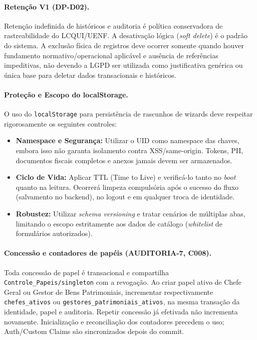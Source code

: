 \paragraph{Retenção V1 (DP-D02).}
Retenção indefinida de históricos e auditoria é política conservadora de rastreabilidade do LCQUI/UENF. A desativação lógica (\textit{soft delete}) é o padrão do sistema. A exclusão física de registros deve ocorrer somente quando houver fundamento normativo/operacional aplicável e ausência de referências impeditivas, não devendo a LGPD ser utilizada como justificativa genérica ou única base para deletar dados transacionais e históricos.

\paragraph{Proteção e Escopo do localStorage.}
O uso do \texttt{localStorage} para persistência de rascunhos de wizards deve respeitar rigorosamente os seguintes controles:
\begin{itemize}
    \item \textbf{Namespace e Segurança:} Utilizar o UID como namespace das chaves, embora isso não garanta isolamento contra XSS/same-origin. Tokens, PII, documentos fiscais completos e anexos jamais devem ser armazenados.
    \item \textbf{Ciclo de Vida:} Aplicar TTL (Time to Live) e verificá-lo tanto no \textit{boot} quanto na leitura. Ocorrerá limpeza compulsória após o sucesso do fluxo (salvamento no backend), no logout e em qualquer troca de identidade.
    \item \textbf{Robustez:} Utilizar \textit{schema versioning} e tratar cenários de múltiplas abas, limitando o escopo estritamente aos dados de catálogo (\textit{whitelist} de formulários autorizados).
\end{itemize}

\paragraph{Concessão e contadores de papéis (AUDITORIA-7, C008).}
Toda concessão de papel é transacional e compartilha \texttt{Controle\_Papeis/singleton} com a revogação. Ao criar papel ativo de Chefe Geral ou Gestor de Bens Patrimoniais, incrementar respectivamente \texttt{chefes\_ativos} ou \texttt{gestores\_patrimoniais\_ativos}, na mesma transação da identidade, papel e auditoria. Repetir concessão já efetivada não incrementa novamente. Inicialização e reconciliação dos contadores precedem o uso; Auth/Custom Claims são sincronizados depois do commit.

